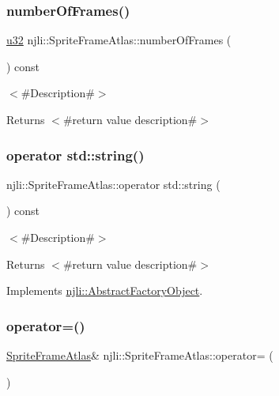 \subsubsection{\texorpdfstring{number\+Of\+Frames()}{numberOfFrames()}}
{\footnotesize\ttfamily \mbox{\hyperlink{_util_8h_a10e94b422ef0c20dcdec20d31a1f5049}{u32}} njli\+::\+Sprite\+Frame\+Atlas\+::number\+Of\+Frames (\begin{DoxyParamCaption}{ }\end{DoxyParamCaption}) const}

$<$\#\+Description\#$>$

\begin{DoxyReturn}{Returns}
$<$\#return value description\#$>$ 
\end{DoxyReturn}
\mbox{\label{classnjli_1_1_sprite_frame_atlas_a21d364411123d55f6dc3e0ee37c30c3c}} 
\subsubsection{\texorpdfstring{operator std\+::string()}{operator std::string()}}
{\footnotesize\ttfamily njli\+::\+Sprite\+Frame\+Atlas\+::operator std\+::string (\begin{DoxyParamCaption}{ }\end{DoxyParamCaption}) const\hspace{0.3cm}{\ttfamily [virtual]}}

$<$\#\+Description\#$>$

\begin{DoxyReturn}{Returns}
$<$\#return value description\#$>$ 
\end{DoxyReturn}


Implements \mbox{\hyperlink{classnjli_1_1_abstract_factory_object_a838f4fa7e65cace6098aab5222892942}{njli\+::\+Abstract\+Factory\+Object}}.

\mbox{\label{classnjli_1_1_sprite_frame_atlas_a6b06945cf5b35035f89f032a784c7c63}} 
\subsubsection{\texorpdfstring{operator=()}{operator=()}}
{\footnotesize\ttfamily \mbox{\hyperlink{classnjli_1_1_sprite_frame_atlas}{Sprite\+Frame\+Atlas}}\& njli\+::\+Sprite\+Frame\+Atlas\+::operator= (\begin{DoxyParamCaption}\item[{const \mbox{\hyperlink{classnjli_1_1_sprite_frame_atlas}{Sprite\+Frame\+Atlas}} \&}]{ }\end{DoxyParamCaption})\hspace{0.3cm}{\ttfamily [protected]}}

